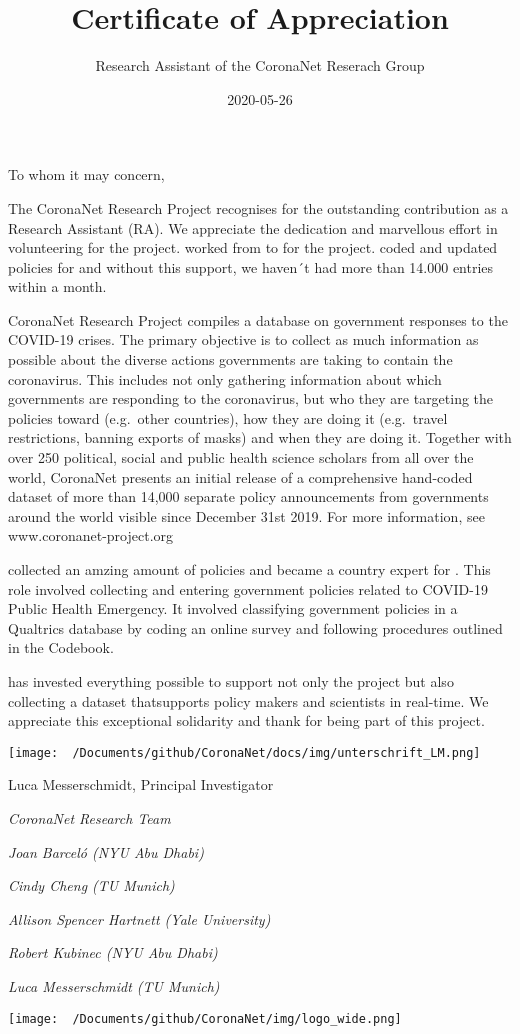 \documentclass[
]{article}
\title{Certificate of Appreciation}
\author{Research Assistant of the CoronaNet Reserach Group}
\date{2020-05-26}
\begin{document}
\maketitle

To whom it may concern,

The CoronaNet Research Project recognises for the outstanding
contribution as a Research Assistant (RA). We appreciate the dedication
and marvellous effort in volunteering for the project. worked from to
for the project. coded and updated policies for and without this
support, we haven´t had more than 14.000 entries within a month.

CoronaNet Research Project compiles a database on government responses
to the COVID-19 crises. The primary objective is to collect as much
information as possible about the diverse actions governments are taking
to contain the coronavirus. This includes not only gathering information
about which governments are responding to the coronavirus, but who they
are targeting the policies toward (e.g.~other countries), how they are
doing it (e.g.~travel restrictions, banning exports of masks) and when
they are doing it. Together with over 250 political, social and public
health science scholars from all over the world, CoronaNet presents an
initial release of a comprehensive hand-coded dataset of more than
14,000 separate policy announcements from governments around the world
visible since December 31st 2019. For more information, see
www.coronanet-project.org

collected an amzing amount of policies and became a country expert for .
This role involved collecting and entering government policies related
to COVID-19 Public Health Emergency. It involved classifying government
policies in a Qualtrics database by coding an online survey and
following procedures outlined in the Codebook.

has invested everything possible to support not only the project but
also collecting a dataset thatsupports policy makers and scientists in
real-time. We appreciate this exceptional solidarity and thank for being
part of this project.

\texttt{[image: ~/Documents/github/CoronaNet/docs/img/unterschrift\_LM.png]}

Luca Messerschmidt, Principal Investigator

\emph{CoronaNet Research Team}

\emph{Joan Barceló (NYU Abu Dhabi)}

\emph{Cindy Cheng (TU Munich)}

\emph{Allison Spencer Hartnett (Yale University)}

\emph{Robert Kubinec (NYU Abu Dhabi)}

\emph{Luca Messerschmidt (TU Munich)}

\texttt{[image: ~/Documents/github/CoronaNet/img/logo\_wide.png]}
\end{document}
